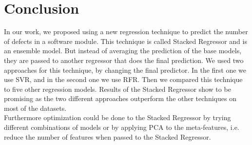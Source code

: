 \documentclass[]{article}
\begin{document}
\section{Conclusion}
In our work, we proposed using a new regression technique to predict the number of defects in a software module. This technique is called Stacked Regressor and is an ensemble model. But instead of averaging the prediction of the base models, they are passed to another regressor that does the final prediction. We used two approaches for this technique, by changing the final predictor. In the first one we use SVR, and in the second one we use RFR. Then we compared this technique to five other regression models. Results of the Stacked Regressor show to be promising as the two different approaches outperform the other techniques on most of the datasets.\\
Furthermore optimization could be done to the Stacked Regressor by trying different combinations of models or by applying PCA to the meta-features, i.e. reduce the number of features when passed to the Stacked Regressor.
\FloatBarrier
\break
{}

	
\end{document}

